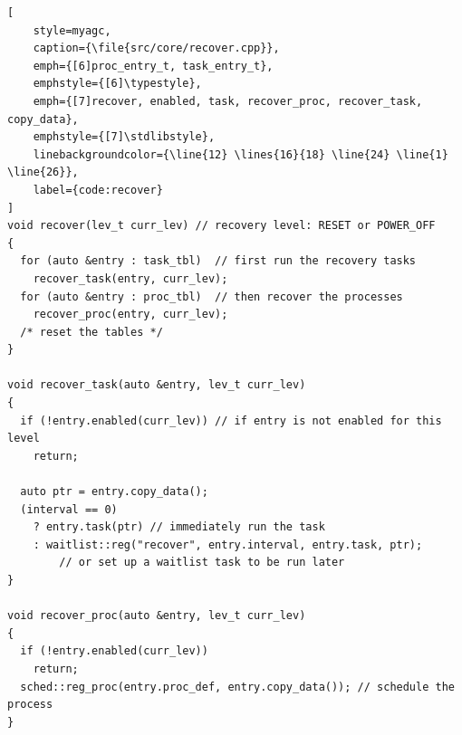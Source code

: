 \begin{lstlisting}[
    style=myagc,
    caption={\file{src/core/recover.cpp}},
    emph={[6]proc_entry_t, task_entry_t},
    emphstyle={[6]\typestyle},
    emph={[7]recover, enabled, task, recover_proc, recover_task, copy_data},
    emphstyle={[7]\stdlibstyle},
    linebackgroundcolor={\line{12} \lines{16}{18} \line{24} \line{1} \line{26}},
    label={code:recover}
]
void recover(lev_t curr_lev) // recovery level: RESET or POWER_OFF
{
  for (auto &entry : task_tbl)  // first run the recovery tasks
    recover_task(entry, curr_lev);
  for (auto &entry : proc_tbl)  // then recover the processes
    recover_proc(entry, curr_lev);
  /* reset the tables */
}

void recover_task(auto &entry, lev_t curr_lev)
{
  if (!entry.enabled(curr_lev)) // if entry is not enabled for this level
    return;

  auto ptr = entry.copy_data();
  (interval == 0) 
    ? entry.task(ptr) // immediately run the task
    : waitlist::reg("recover", entry.interval, entry.task, ptr);
        // or set up a waitlist task to be run later
}

void recover_proc(auto &entry, lev_t curr_lev)
{
  if (!entry.enabled(curr_lev))
    return;
  sched::reg_proc(entry.proc_def, entry.copy_data()); // schedule the process
}
\end{lstlisting}



